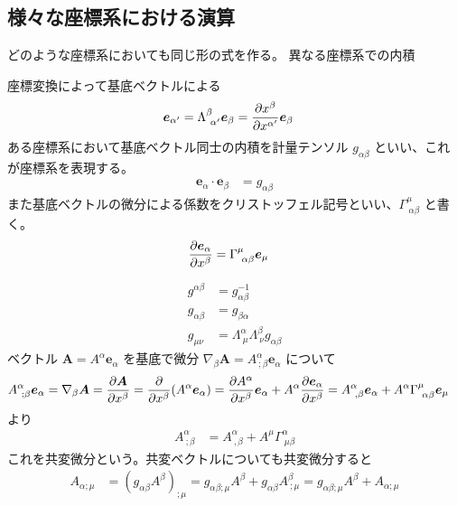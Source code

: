 \documentclass[uplatex,dvipdfmx,a4paper,11pt]{jlreq}
\renewcommand{\AA}{\bm{A}}
\newcommand{\ee}{\bm{e}}
\theoremstyle{definition}
\begin{document}
\subsection{様々な座標系における演算}
どのような座標系においても同じ形の式を作る。
異なる座標系での内積
\begin{definition}[座標系の基底ベクトル]
  座標変換によって基底ベクトルによる
  \begin{align}
    \ee_{\alpha'} & = \Lambda_{\ \alpha'}^\beta\ee_\beta = \diffp{x^\beta}{x^{\alpha'}}\ee_\beta
  \end{align}
  ある座標系において基底ベクトル同士の内積を計量テンソル $g_{\alpha\beta}$ といい、これが座標系を表現する。
  \begin{align}
    \ee_\alpha\cdot\ee_\beta & = g_{\alpha\beta}
  \end{align}
  また基底ベクトルの微分による係数をクリストッフェル記号といい、$\Gamma^\mu_{\ \alpha\beta}$ と書く。
  \begin{align}
    \diffp{\ee_\alpha}{x^\beta} & = \Gamma^\mu_{\ \alpha\beta}\ee_\mu
  \end{align}
\end{definition}
\begin{align}
  g^{\alpha\beta} & = g_{\alpha\beta}^{-1}                                       \\
  g_{\alpha\beta} & = g_{\beta\alpha}                                            \\
  g_{\mu\nu}      & = \Lambda^\alpha_{\ \mu}\Lambda^\beta_{\ \nu}g_{\alpha\beta}
\end{align}
ベクトル $\AA = A^\alpha\ee_\alpha$ を基底で微分 $\nabla_\beta\AA = A^\alpha_{\ ;\beta}\ee_\alpha$ について
\begin{align}
  A^\alpha_{\ ;\beta}\ee_\alpha & = \nabla_\beta\AA = \diffp{\AA}{x^\beta} = \diffp{}{x^\beta}(A^\alpha\ee_\alpha) = \diffp{A^\alpha}{x^\beta}\ee_\alpha + A^\alpha\diffp{\ee_\alpha}{x^\beta} = A^\alpha_{\ ,\beta}\ee_\alpha + A^\alpha\Gamma^\mu_{\ \alpha\beta}\ee_\mu
\end{align}
より
\begin{align}
  A^\alpha_{\ ;\beta} & = A^\alpha_{\ ,\beta} + A^\mu\Gamma^\alpha_{\ \mu\beta}
\end{align}
これを共変微分という。共変ベクトルについても共変微分すると
\begin{align}
  A_{\alpha;\mu} & = (g_{\alpha\beta}A^{\beta})_{;\mu} = g_{\alpha\beta;\mu}A^{\beta} + g_{\alpha\beta}A^{\beta}_{\ ;\mu} = g_{\alpha\beta;\mu}A^{\beta} + A_{\alpha;\mu}
\end{align}
\end{document}
